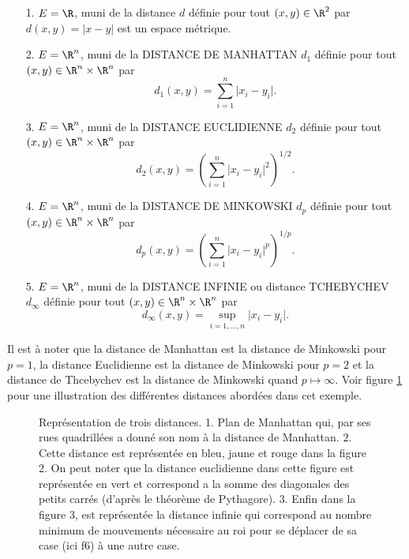 \documentclass[class=report,crop=false]{standalone}
\begin{document}
 

\begin{exemple}
 \textcolor[rgb]{0.00,0.59,0.00}
{$ $\\
\begin{itemize}
\item[1.] $E=\R$, muni de la distance $d$ définie pour tout $(x,y) \in \R^2$ par $d(x,y)=\vert x-y\vert$ est un espace métrique.
\item[2.] $E= \R^n$, muni de la DISTANCE DE MANHATTAN $d_1$ définie pour tout $(x,y) \in  \R^n \times \R^n$  par
\begin{equation*}
d_1(x,y)=\displaystyle \sum_{i=1}^n \vert x_i-y_i\vert.
\end{equation*}
\item[3.] $E= \R^n$, muni de la DISTANCE EUCLIDIENNE $d_2$ définie pour tout $(x,y) \in  \R^n \times \R^n$  par
\begin{equation*}
d_2(x,y)= (\displaystyle \sum_{i=1}^n \vert x_i-y_i\vert^2)^{1/2}.
\end{equation*}
\item[4.] $E= \R^n$, muni de la DISTANCE DE MINKOWSKI $d_p$ définie pour tout $(x,y) \in  \R^n \times \R^n$  par
\begin{equation*}
d_p(x,y)= (\displaystyle \sum_{i=1}^n \vert x_i-y_i\vert^p)^{1/p}.
\end{equation*}
\item[5.] $E= \R^n$, muni de la DISTANCE INFINIE ou distance  TCHEBYCHEV $d_{\infty}$ définie pour tout $(x,y) \in  \R^n \times \R^n$  par
\begin{equation*}
d_{\infty}(x,y)= \displaystyle \sup_{i=1,...,n} \vert x_i-y_i\vert.
\end{equation*}
\end{itemize}
Il est à noter que la distance de Manhattan est la distance de Minkowski pour $p=1$, la distance Euclidienne est la distance de Minkowski pour $p=2$ et la distance de Thcebychev est la distance de Minkowski quand $p \mapsto \infty$. Voir figure \ref{fig:distance} pour une illustration des différentes distances abordées dans cet exemple.
\begin{figure}[!h]
    \caption{Représentation de trois distances. 1. Plan de Manhattan qui, par ses rues quadrillées a donné son nom à la distance de Manhattan. 2. Cette distance est représentée en bleu, jaune et rouge dans la figure 2. On peut noter que la distance euclidienne dans cette figure est représentée en vert et correspond a la somme des diagonales des petits carrés (d'après le théorème de Pythagore). 3. Enfin dans la figure 3, est représentée la distance infinie qui correspond au nombre minimum de mouvements nécessaire au roi pour se déplacer de sa case (ici f6) à une autre case.  }
      \label{fig:distance}
\end{figure}
}

\end{exemple}
\end{document}

